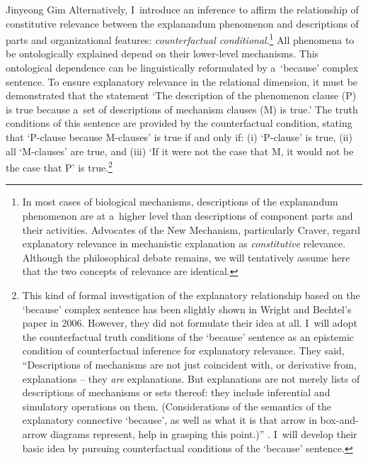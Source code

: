 \begin{artengenv}{Jinyeong Gim}
Alternatively, I~introduce an inference to affirm the relationship of constitutive relevance between the explanandum phenomenon and descriptions of parts and organizational features: \textit{counterfactual conditional}.\footnote{In most cases of biological mechanisms, descriptions of the explanandum phenomenon are at a~higher level than descriptions of component parts and their activities. Advocates of the New Mechanism, particularly Craver, regard explanatory relevance in mechanistic explanation as \textit{constitutive} relevance. Although the philosophical debate remains, we will tentatively assume here that the two concepts of relevance are identical.} All phenomena to be ontologically explained depend on their lower-level mechanisms. This ontological dependence can be linguistically reformulated by a~‘because' complex sentence. To ensure explanatory relevance in the relational dimension, it must be demonstrated that the statement ‘The description of the phenomenon clause (P) is true because a~set of descriptions of mechanism clauses (M) is true.' The truth conditions of this sentence are provided by the counterfactual condition, stating that ‘P-clause because M-clauses' is true if and only if: (i) ‘P-clause' is true, (ii) all ‘M-clauses' are true, and (iii) ‘If it were not the case that M, it would not be the case that P' is true.\footnote{This kind of formal investigation of the explanatory relationship based on the ‘because' complex sentence has been slightly shown in Wright and Bechtel's paper in 2006. However, they did not formulate their idea at all. I~will adopt the counterfactual truth conditions of the ‘because' sentence as an epistemic condition of counterfactual inference for explanatory relevance. They said, ``Descriptions of mechanisms are not just coincident with, or derivative from, explanations -- they \textit{are} explanations. But explanations are not merely lists of descriptions of mechanisms or sets thereof: they include inferential and simulatory operations on them. (Considerations of the semantics of the explanatory connective ‘because', as well as what it is that arrow in box-and-arrow diagrams represent, help in grasping this point.)''
\parencite[][emphasis original]{wright_mechanisms_2007}. %
 I~will develop their basic idea by pursuing counterfactual conditions of the ‘because' sentence.}


\end{artengenv}
